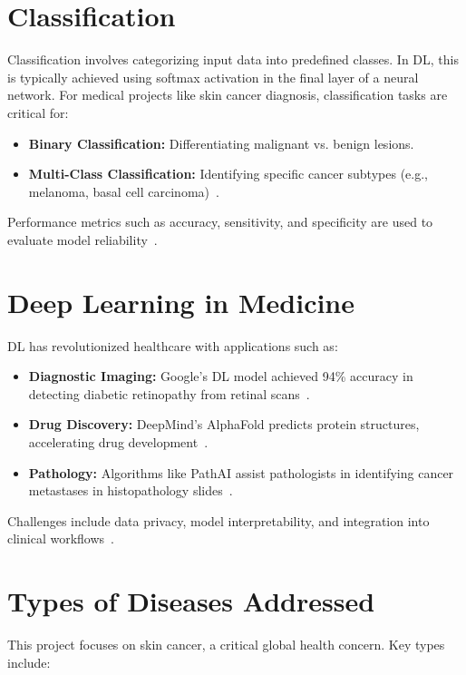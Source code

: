 \documentclass[a4paper,12pt]{report}
\begin{document}
\begin{spacing}{1.5}
    \section{Classification}
    Classification involves categorizing input data into predefined classes. In DL, this is typically achieved using softmax activation in the final layer of a neural network. For medical projects like skin cancer diagnosis, classification tasks are critical for:
    \begin{itemize}
        \item \textbf{Binary Classification:} Differentiating malignant vs. benign lesions.
        \item \textbf{Multi-Class Classification:} Identifying specific cancer subtypes (e.g., melanoma, basal cell carcinoma)~\cite{dl6}.
    \end{itemize}
      Performance metrics such as accuracy, sensitivity, and specificity are used to evaluate model reliability~\cite{dl7}.
    
    \section{Deep Learning in Medicine}
    DL has revolutionized healthcare with applications such as:

    \begin{itemize}
        \item \textbf{Diagnostic Imaging:} Google’s DL model achieved 94\% accuracy in detecting diabetic retinopathy from retinal scans~\cite{dl8}.
        \item \textbf{Drug Discovery:} DeepMind’s AlphaFold predicts protein structures, accelerating drug development~\cite{dl9}.
        \item \textbf{Pathology:} Algorithms like PathAI assist pathologists in identifying cancer metastases in histopathology slides~\cite{dl10}.
    \end{itemize}
    Challenges include data privacy, model interpretability, and integration into clinical workflows~\cite{dl11}.
    
    \section{Types of Diseases Addressed}
    This project focuses on skin cancer, a critical global health concern. Key types include:
    

\end{spacing}
\end{document}
